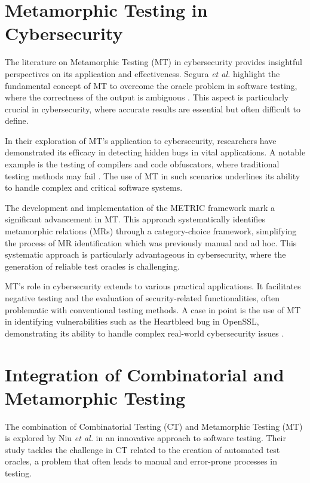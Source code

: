 \section{Metamorphic Testing in Cybersecurity}\label{sec:metamorphic-testing-in-cybersecurity}

The literature on Metamorphic Testing (MT) in cybersecurity provides insightful perspectives on its application and effectiveness. Segura \textit{et al.} highlight the fundamental concept of MT to overcome the oracle problem in software testing, where the correctness of the output is ambiguous \cite{CybersecurityMT}. This aspect is particularly crucial in cybersecurity, where accurate results are essential but often difficult to define.

In their exploration of MT's application to cybersecurity, researchers have demonstrated its efficacy in detecting hidden bugs in vital applications. A notable example is the testing of compilers and code obfuscators, where traditional testing methods may fail \cite{CybersecurityMT} \cite{GLSLFuzz}. The use of MT in such scenarios underlines its ability to handle complex and critical software systems.

The development and implementation of the METRIC framework \cite{ChenPoon2016} mark a significant advancement in MT. This approach systematically identifies metamorphic relations (MRs) through a category-choice framework, simplifying the process of MR identification which was previously manual and ad hoc. This systematic approach is particularly advantageous in cybersecurity, where the generation of reliable test oracles is challenging.

MT's role in cybersecurity extends to various practical applications.
It facilitates negative testing and the evaluation of security-related functionalities, often problematic with conventional testing methods. A case in point is the use of MT in identifying vulnerabilities such as the Heartbleed bug in OpenSSL, demonstrating its ability to handle complex real-world cybersecurity issues \cite{OpenSSLMT}.


\section{Integration of Combinatorial and Metamorphic Testing}\label{sec:integration-of-combinatorial-and-metamorphic-testing}

The combination of Combinatorial Testing (CT) and Metamorphic Testing (MT) is explored by Niu \textit{et al.} \cite{comer} in an innovative approach to software testing. Their study tackles the challenge in CT related to the creation of automated test oracles, a problem that often leads to manual and error-prone processes in testing.

